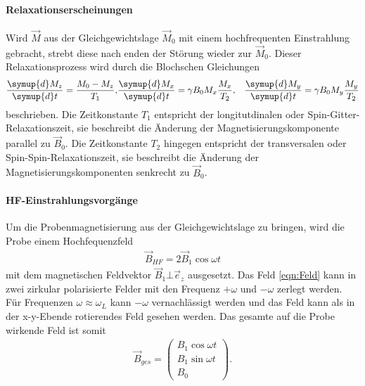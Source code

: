 \paragraph{Relaxationserscheinungen}
Wird $\vec{M}$ aus der Gleichgewichtslage $\vec{M}_0$
mit einem hochfrequenten Einstrahlung gebracht, strebt diese
nach enden der Störung wieder zur $\vec{M}_0$.
Dieser Relaxationsprozess wird durch die
Blochschen Gleichungen
\begin{align}
  \frac{\symup{d}M_z}{\symup{d}t}=\frac{M_0-M_z}{T_1},
  &\frac{\symup{d}M_x}{\symup{d}t}=\gamma B_0 M_x\frac{M_x}{T_2},
  &\frac{\symup{d}M_y}{\symup{d}t}=\gamma B_0 M_y\frac{M_y}{T_2}
\end{align}
beschrieben.
Die Zeitkonstante $T_1$ entspricht
der longitutdinalen oder Spin-Gitter-Relaxationszeit, sie
beschreibt die Änderung der Magnetisierungskomponente parallel zu
$\vec{B}_0$. Die Zeitkonstante $T_2$ hingegen entspricht
der transversalen oder Spin-Spin-Relaxationszeit, sie
beschreibt die Änderung der Magnetisierungskomponenten
senkrecht zu $\vec{B}_0$.

\paragraph{HF-Einstrahlungsvorgänge}
\label{para:HF}
Um die Probenmagnetisierung aus der Gleichgewichtslage
zu bringen, wird die Probe einem Hochfequenzfeld
\begin{align}
   \vec{B}_{HF}=2\vec{B}_1 \cos\omega t \label{eqn:Feld}
\end{align}
mit dem magnetischen
Feldvektor $\vec{B}_1 \bot \vec{e}_z$ ausgesetzt.
Das Feld \eqref{eqn:Feld} kann in
zwei zirkular polarisierte Felder mit den Frequenz
$+\omega$ und $-\omega$ zerlegt werden.
Für Frequenzen $\omega\approx\omega_L$
kann $-\omega$ vernachlässigt werden und
das Feld kann als in der x-y-Ebende rotierendes Feld
gesehen werden. Das gesamte auf die Probe
wirkende Feld ist somit
\begin{align}
\vec{B}_{ges}=  \left( \begin{array}{c} B_1 \cos \omega t \\ B_1 \sin \omega t \\ B_0 \end{array}\right).
\end{align}

